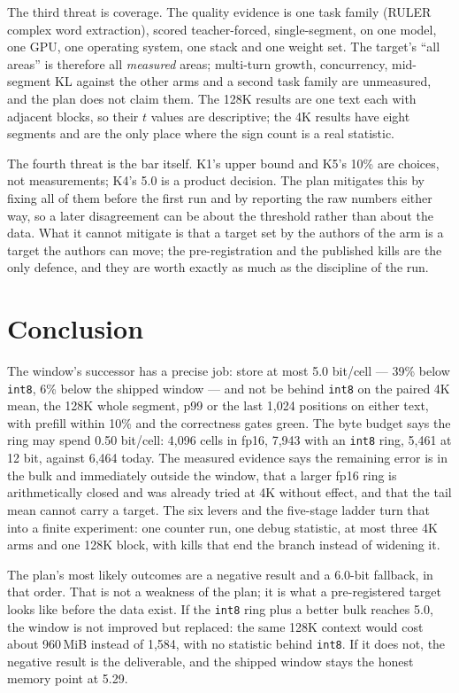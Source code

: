 \documentclass[10pt,twocolumn]{article}
\begin{document}
The third threat is coverage. The quality evidence is one task family (RULER complex word extraction), scored teacher-forced, single-segment, on one model, one GPU, one operating system, one stack and one weight set. The target's ``all areas'' is therefore all \emph{measured} areas; multi-turn growth, concurrency, mid-segment KL against the other arms and a second task family are unmeasured, and the plan does not claim them. The 128K results are one text each with adjacent blocks, so their $t$ values are descriptive; the 4K results have eight segments and are the only place where the sign count is a real statistic.

The fourth threat is the bar itself. K1's upper bound and K5's 10\% are choices, not measurements; K4's 5.0 is a product decision. The plan mitigates this by fixing all of them before the first run and by reporting the raw numbers either way, so a later disagreement can be about the threshold rather than about the data. What it cannot mitigate is that a target set by the authors of the arm is a target the authors can move; the pre-registration and the published kills are the only defence, and they are worth exactly as much as the discipline of the run.

\section{Conclusion}

The window's successor has a precise job: store at most 5.0 bit/cell --- 39\% below \texttt{int8}, 6\% below the shipped window --- and not be behind \texttt{int8} on the paired 4K mean, the 128K whole segment, p99 or the last 1,024 positions on either text, with prefill within 10\% and the correctness gates green. The byte budget says the ring may spend 0.50 bit/cell: 4,096 cells in fp16, 7,943 with an \texttt{int8} ring, 5,461 at 12 bit, against 6,464 today. The measured evidence says the remaining error is in the bulk and immediately outside the window, that a larger fp16 ring is arithmetically closed and was already tried at 4K without effect, and that the tail mean cannot carry a target. The six levers and the five-stage ladder turn that into a finite experiment: one counter run, one debug statistic, at most three 4K arms and one 128K block, with kills that end the branch instead of widening it.

The plan's most likely outcomes are a negative result and a 6.0-bit fallback, in that order. That is not a weakness of the plan; it is what a pre-registered target looks like before the data exist. If the \texttt{int8} ring plus a better bulk reaches 5.0, the window is not improved but replaced: the same 128K context would cost about 960\,MiB instead of 1,584, with no statistic behind \texttt{int8}. If it does not, the negative result is the deliverable, and the shipped window stays the honest memory point at 5.29.
\end{document}
